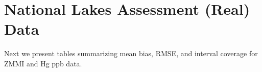 \documentclass[]{elsarticle} %
\begin{document}
\begin{table}[ht]
\centering
{}
\caption{Sampling-inference combination (Approach), population layout (Layout), response type (Response), proportion of dependent random error (DRE\%), sample size (n), mean bias (MB), root-mean-squared error (RMSE), and 95\% interval coverage (Coverage) in simulation scenario 36.} 
\end{table}

\hypertarget{sec:datatabs}{%
\section{National Lakes Assessment (Real) Data}\label{sec:datatabs}}

Next we present tables summarizing mean bias, RMSE, and interval
coverage for ZMMI and Hg ppb data.
\end{document}
